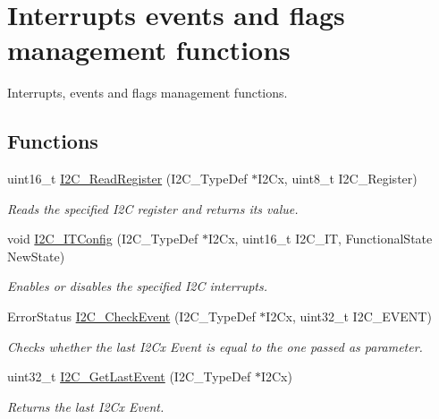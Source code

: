 \hypertarget{group___i2_c___group5}{}\section{Interrupts events and flags management functions}
\label{group___i2_c___group5}


Interrupts, events and flags management functions.  


\subsection*{Functions}
\begin{DoxyCompactItemize}
\item 
uint16\+\_\+t \mbox{\hyperlink{group___i2_c___group5_ga8021dc796d15f997356b0583d6346805}{I2\+C\+\_\+\+Read\+Register}} (I2\+C\+\_\+\+Type\+Def $\ast$I2\+Cx, uint8\+\_\+t I2\+C\+\_\+\+Register)
\begin{DoxyCompactList}\small\item\em Reads the specified I2C register and returns its value. \end{DoxyCompactList}\item 
void \mbox{\hyperlink{group___i2_c___group5_ga58fed146a06cb81d2940604e460de047}{I2\+C\+\_\+\+I\+T\+Config}} (I2\+C\+\_\+\+Type\+Def $\ast$I2\+Cx, uint16\+\_\+t I2\+C\+\_\+\+IT, Functional\+State New\+State)
\begin{DoxyCompactList}\small\item\em Enables or disables the specified I2C interrupts. \end{DoxyCompactList}\item 
Error\+Status \mbox{\hyperlink{group___i2_c___group5_ga2d5701342f9d4c1f09bf9d3cdcacc326}{I2\+C\+\_\+\+Check\+Event}} (I2\+C\+\_\+\+Type\+Def $\ast$I2\+Cx, uint32\+\_\+t I2\+C\+\_\+\+E\+V\+E\+NT)
\begin{DoxyCompactList}\small\item\em Checks whether the last I2\+Cx Event is equal to the one passed as parameter. \end{DoxyCompactList}\item 
uint32\+\_\+t \mbox{\hyperlink{group___i2_c___group5_ga29237aea9b5a3ead33167e1d027e9f1a}{I2\+C\+\_\+\+Get\+Last\+Event}} (I2\+C\+\_\+\+Type\+Def $\ast$I2\+Cx)
\begin{DoxyCompactList}\small\item\em Returns the last I2\+Cx Event. \end{DoxyCompactList}\item 

\end{DoxyCompactItemize}
